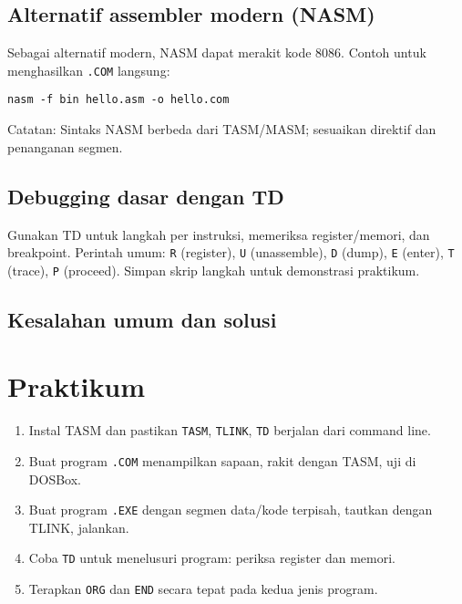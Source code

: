 \subsection{Alternatif assembler modern (NASM)}
Sebagai alternatif modern, NASM dapat merakit kode 8086. Contoh untuk menghasilkan \texttt{.COM} langsung: \cite{nasm_manual}
\begin{verbatim}
nasm -f bin hello.asm -o hello.com
\end{verbatim}
Catatan: Sintaks NASM berbeda dari TASM/MASM; sesuaikan direktif dan penanganan segmen.

\subsection{Debugging dasar dengan TD}
Gunakan TD untuk langkah per instruksi, memeriksa register/memori, dan breakpoint. Perintah umum: \texttt{R} (register), \texttt{U} (unassemble), \texttt{D} (dump), \texttt{E} (enter), \texttt{T} (trace), \texttt{P} (proceed). Simpan skrip langkah untuk demonstrasi praktikum. \cite{borland1990tasm}

\subsection{Kesalahan umum dan solusi}

\section{Praktikum}
\begin{enumerate}
  \item Instal TASM dan pastikan \texttt{TASM}, \texttt{TLINK}, \texttt{TD} berjalan dari command line.
  \item Buat program \texttt{.COM} menampilkan sapaan, rakit dengan TASM, uji di DOSBox.
  \item Buat program \texttt{.EXE} dengan segmen data/kode terpisah, tautkan dengan TLINK, jalankan.
  \item Coba \texttt{TD} untuk menelusuri program: periksa register dan memori.
  \item Terapkan \texttt{ORG} dan \texttt{END} secara tepat pada kedua jenis program.
\end{enumerate}


